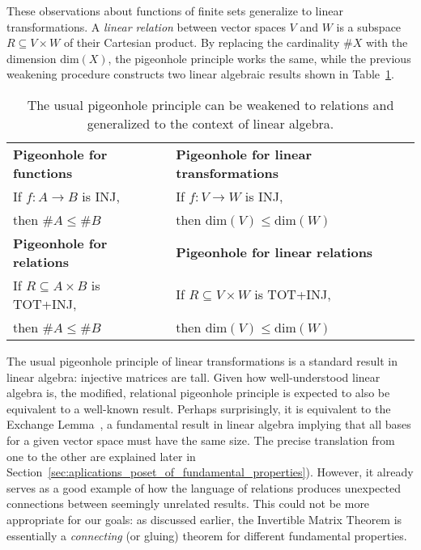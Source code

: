 \documentclass[manyauthors]{fundam}
\begin{document}
These observations about functions of finite sets generalize to linear transformations. A \emph{linear relation} between vector spaces $V$ and $W$ is a subspace $R \subseteq V \times W$ of their Cartesian product.
By replacing the cardinality $\# X$ with the dimension $\text{dim}(X)$, the pigeonhole principle works the same, while the previous weakening procedure constructs two linear algebraic results shown in Table~\ref{tab:pigeonhole_4}.

\begin{table}[h]
    \centering
    \bgroup
      \renewcommand{\arraystretch}{1}
      \setlength\tabcolsep{1cm}
      \begin{tabular}{l l}
        \textbf{Pigeonhole for functions} & \textbf{Pigeonhole for linear transformations}  \\[1mm]
          If $f : A \to B$ is INJ, & If $f : V \to W$ is INJ, \\
          then $\# A \leq \# B$ & then $\text{dim}(V) \leq \text{dim}(W)$ \\[5mm]
          \textbf{Pigeonhole for relations} & \textbf{Pigeonhole for linear relations} \\[1mm]
          If $R \subseteq A \times B$ is TOT+INJ, & If $R \subseteq V \times W$ is TOT+INJ, \\
          then $\# A \leq \# B$ & then $\text{dim}(V) \leq \text{dim}(W)$
      \end{tabular}
    \egroup
    \caption{The usual pigeonhole principle can be weakened to relations and generalized to the context of linear algebra.}
    \label{tab:pigeonhole_4}
\end{table}

The usual pigeonhole principle of linear transformations is a standard result in linear algebra: injective matrices are tall.
Given how well-understood linear algebra is, the modified, relational pigeonhole principle is expected to also be equivalent to a well-known result.
Perhaps surprisingly, it is equivalent to the Exchange Lemma~\cite[Page 35; 2.22]{axler2024linear}, a fundamental result in linear algebra implying that all bases for a given vector space must have the same size. The precise translation from one to the other are explained later in Section~\ref{sec:aplications_poset_of_fundamental_properties}).
However, it already serves as a good example of how the language of relations produces unexpected connections between seemingly unrelated results. This could not be more appropriate for our goals: as discussed earlier, the Invertible Matrix Theorem is essentially a \emph{connecting} (or gluing) theorem for different fundamental properties.
\end{document}
